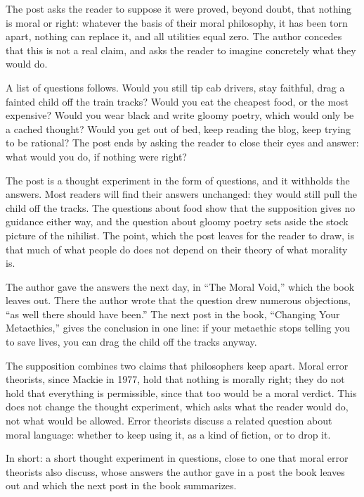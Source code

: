 \begin{afterword}
\summaryhead

The post asks the reader to suppose it were proved, beyond doubt, that nothing is moral or right: whatever the basis of their moral philosophy, it has been torn apart, nothing can replace it, and all utilities equal zero. The author concedes that this is not a real claim, and asks the reader to imagine concretely what they would do.

A list of questions follows. Would you still tip cab drivers, stay faithful, drag a fainted child off the train tracks? Would you eat the cheapest food, or the most expensive? Would you wear black and write gloomy poetry, which would only be a cached thought? Would you get out of bed, keep reading the blog, keep trying to be rational? The post ends by asking the reader to close their eyes and answer: what would you do, if nothing were right?

\responsehead

The post is a thought experiment in the form of questions, and it withholds the answers. Most readers will find their answers unchanged: they would still pull the child off the tracks. The questions about food show that the supposition gives no guidance either way, and the question about gloomy poetry sets aside the stock picture of the nihilist. The point, which the post leaves for the reader to draw, is that much of what people do does not depend on their theory of what morality is.

The author gave the answers the next day, in ``The Moral Void,'' which the book leaves out. There the author wrote that the question drew numerous objections, ``as well there should have been.'' The next post in the book, ``Changing Your Metaethics,'' gives the conclusion in one line: if your metaethic stops telling you to save lives, you can drag the child off the tracks anyway.

The supposition combines two claims that philosophers keep apart. Moral error theorists, since Mackie in 1977, hold that nothing is morally right; they do not hold that everything is permissible, since that too would be a moral verdict. This does not change the thought experiment, which asks what the reader would do, not what would be allowed. Error theorists discuss a related question about moral language: whether to keep using it, as a kind of fiction, or to drop it.

In short: a short thought experiment in questions, close to one that moral error theorists also discuss, whose answers the author gave in a post the book leaves out and which the next post in the book summarizes.
\end{afterword}
